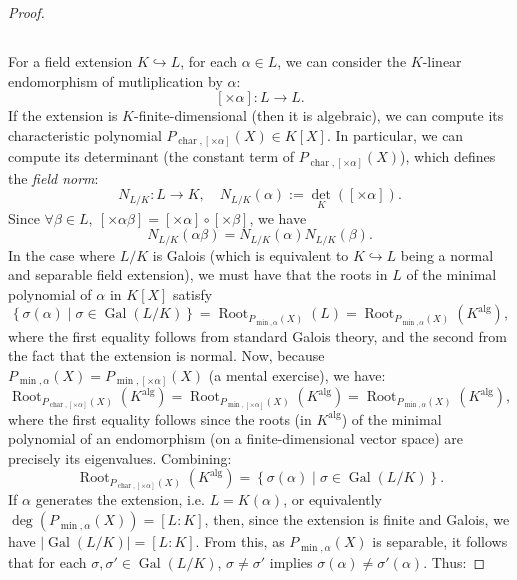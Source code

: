 \documentclass[11pt, a4paper, oneside]{article}
\theoremstyle{remark}
\theoremstyle{lemma}
\begin{document}
\begin{proof}
\subsection{}
\label{A.2}
For a field extension \( K \hookrightarrow L \), for each \( \alpha \in L \), we can consider the \( K \)-linear endomorphism of mutliplication by \(\alpha\):
\[
[\times \alpha] : L \rightarrow L.
\]
If the extension is \(K\)-finite-dimensional (then it is algebraic), we can compute its characteristic polynomial \( P_{\operatorname{char}, [\times \alpha]}(X) \in K[X] \). In particular, we can compute its determinant (the constant term of \( P_{\operatorname{char}, [\times \alpha]}(X) \)), which defines the \textit{field norm}:
\[
N_{L/K} : L \rightarrow K, \quad N_{L/K}(\alpha) := {\det}_{K}([\times \alpha]).
\]
Since \( \forall \beta \in L,\ [\times \alpha \beta] = [\times \alpha] \circ [\times \beta] \), we have
\[
N_{L/K}(\alpha \beta) = N_{L/K}(\alpha) N_{L/K}(\beta).
\]
In the case where \( L/K \) is Galois (which is equivalent to \( K \hookrightarrow L \) being a normal and separable field extension), we must have that the roots in \( L \) of the minimal polynomial of \( \alpha \) in \( K[X] \) satisfy
\[
\left\{ \sigma(\alpha) \mid \sigma \in \operatorname{Gal}(L/K) \right\} = \operatorname{Root}_{P_{\min, \alpha}(X)}(L) = \operatorname{Root}_{P_{\min, \alpha}(X)}\left( K^{\mathrm{alg}} \right),
\]
where the first equality follows from standard Galois theory, and the second from the fact that the extension is normal. Now, because \( P_{\min, \alpha}(X) = P_{\min, [\times \alpha]}(X) \) (a mental exercise), we have:
\[
\operatorname{Root}_{P_{\operatorname{char}, [\times \alpha]}(X)}\left( K^{\mathrm{alg}} \right) = \operatorname{Root}_{P_{\min, [\times \alpha]}(X)}\left( K^{\mathrm{alg}} \right) = \operatorname{Root}_{P_{\min, \alpha}(X)}\left( K^{\mathrm{alg}} \right),
\]
where the first equality follows since the roots (in \( K^{\mathrm{alg}} \)) of the minimal polynomial of an endomorphism (on a finite-dimensional vector space) are precisely its eigenvalues. Combining:
\begin{equation}
\label{A.2.1}
\tag{1}
\operatorname{Root}_{P_{\operatorname{char}, [\times \alpha]}(X)}\left( K^{\mathrm{alg}} \right) = \left\{ \sigma(\alpha) \mid \sigma \in \operatorname{Gal}(L/K) \right\}.
\end{equation}
If \( \alpha \) generates the extension, i.e. \( L = K(\alpha) \), or equivalently \( \deg\left( P_{\min, \alpha}(X) \right) = [L:K] \), then, since the extension is finite and Galois, we have \( \left| \operatorname{Gal}(L/K) \right| = [L:K] \). From this, as \( P_{\min, \alpha}(X) \) is separable, it follows that for each \( \sigma, \sigma' \in \operatorname{Gal}(L/K) \), \( \sigma \neq \sigma' \) implies \( \sigma(\alpha) \neq \sigma'(\alpha) \). Thus:

\end{proof}
\end{document}
